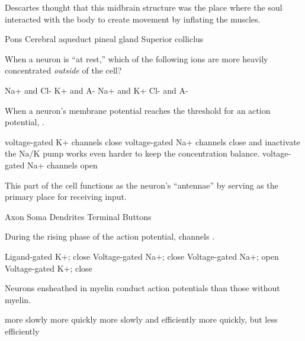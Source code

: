 \documentclass[answers]{exam}
\begin{document}
\begin{questions}
\newpage

\question Descartes thought that this midbrain structure was the place where the soul interacted with the body to create movement by inflating the muscles.
\begin{choices}
\choice Pons
\choice Cerebral aqueduct
\correctchoice pineal gland
\choice Superior colliclus
\end{choices}

\question When a neuron is “at rest,” which of the following ions are more heavily concentrated \emph{outside} of the cell?
\begin{choices}
\correctchoice Na+ and Cl-
\choice K+ and A-
\choice Na+ and K+
\choice Cl- and A-
\end{choices}

\question When a neuron's membrane potential reaches the threshold for an action potential, \fillin.
\begin{choices}
\choice voltage-gated K+ channels close
\choice voltage-gated Na+ channels close and inactivate
\choice the Na/K pump works even harder to keep the concentration balance.
\correctchoice voltage-gated Na+ channels open
\end{choices}

\question This part of the cell functions as the neuron’s “antennae” by serving as the primary place for receiving input.
\begin{choices}
\choice Axon
\choice Soma
\correctchoice Dendrites
\choice Terminal Buttons
\end{choices}

\question During the rising phase of the action potential, \fillin channels \fillin.
\begin{choices}
\choice Ligand-gated K+; close
\choice Voltage-gated Na+; close
\correctchoice Voltage-gated Na+; open
\choice Voltage-gated K+; close
\end{choices}

\question Neurons ensheathed in myelin conduct action potentials \fillin than those without myelin.
\begin{choices}
\choice more slowly
\correctchoice more quickly
\choice more slowly and efficiently
\choice more quickly, but less efficiently
\end{choices}



\end{questions}
\end{document}
